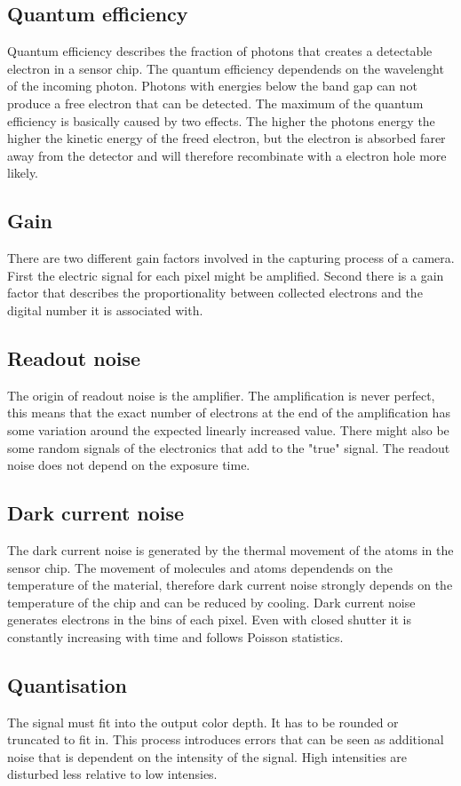\subsection{Quantum efficiency}
Quantum efficiency describes the fraction of photons that creates a detectable electron in a sensor chip. The quantum efficiency dependends on the wavelenght of the incoming photon. Photons with energies below the band gap can not produce a free electron that can be detected. The maximum of the quantum efficiency is basically caused by two effects. The higher the photons energy the higher the kinetic energy of the freed electron, but the electron is absorbed farer away from the detector and will therefore recombinate with a electron hole more likely.
\subsection{Gain}
There are two different gain factors involved in the capturing process of a camera. First the electric signal for each pixel might be amplified. Second there is a gain factor that describes the proportionality between collected electrons and the digital number it is associated with.
\subsection{Readout noise}
The origin of readout noise is the amplifier. The amplification is never perfect, this means that the exact number of electrons at the end of the amplification has some variation around the expected linearly increased value. There might also be some random signals of the electronics that add to the "true" signal. The readout noise does not depend on the exposure time.
\subsection{Dark current noise}
The dark current noise is generated by the thermal movement of the atoms in the sensor chip. The movement of molecules and atoms dependends on the temperature of the material, therefore dark current noise strongly depends on the temperature of the chip and can be reduced by cooling. Dark current noise generates electrons in the bins of each pixel. Even with closed shutter it is constantly increasing with time and follows Poisson statistics.
\subsection{Quantisation}
The signal must fit into the output color depth. It has to be rounded or truncated to fit in. This process introduces errors that can be seen as additional noise that is dependent on the intensity of the signal. High intensities are disturbed less relative to low intensies.


